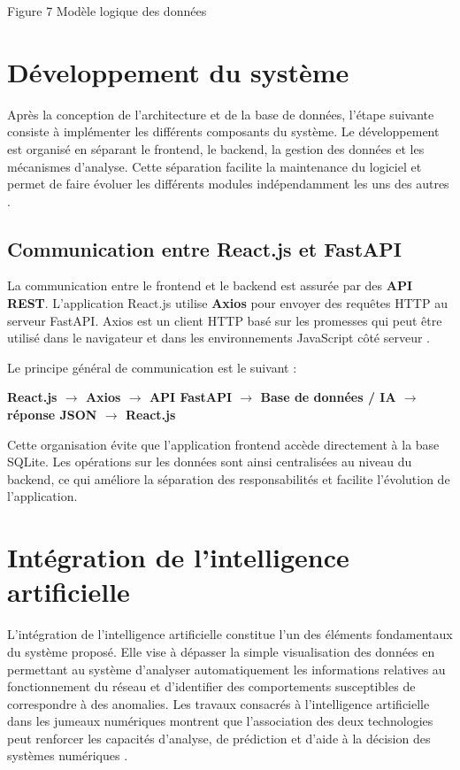 Figure 7 Modèle logique des données

\section{Développement du système}

Après la conception de l'architecture et de la base de données, l'étape
suivante consiste à implémenter les différents composants du système.
Le développement est organisé en séparant le frontend, le backend, la
gestion des données et les mécanismes d'analyse. Cette séparation
facilite la maintenance du logiciel et permet de faire évoluer les
différents modules indépendamment les uns des autres
\cite{ref106,ref126}.

\subsection{Communication entre React.js et FastAPI}

La communication entre le frontend et le backend est assurée par des
\textbf{API REST}. L'application React.js utilise \textbf{Axios} pour
envoyer des requêtes HTTP au serveur FastAPI. Axios est un client HTTP
basé sur les promesses qui peut être utilisé dans le navigateur et
dans les environnements JavaScript côté serveur
\cite{ref131}.

Le principe général de communication est le suivant :

\begin{center}
	\textbf{React.js $\rightarrow$ Axios $\rightarrow$ API FastAPI
		$\rightarrow$ Base de données / IA $\rightarrow$ réponse JSON
		$\rightarrow$ React.js}
\end{center}

Cette organisation évite que l'application frontend accède directement
à la base SQLite. Les opérations sur les données sont ainsi centralisées
au niveau du backend, ce qui améliore la séparation des responsabilités
et facilite l'évolution de l'application.

\section{Intégration de l'intelligence artificielle}

L'intégration de l'intelligence artificielle constitue l'un des éléments
fondamentaux du système proposé. Elle vise à dépasser la simple
visualisation des données en permettant au système d'analyser
automatiquement les informations relatives au fonctionnement du réseau
et d'identifier des comportements susceptibles de correspondre à des
anomalies. Les travaux consacrés à l'intelligence artificielle dans les
jumeaux numériques montrent que l'association des deux technologies
peut renforcer les capacités d'analyse, de prédiction et d'aide à la
décision des systèmes numériques \cite{ref132}.

